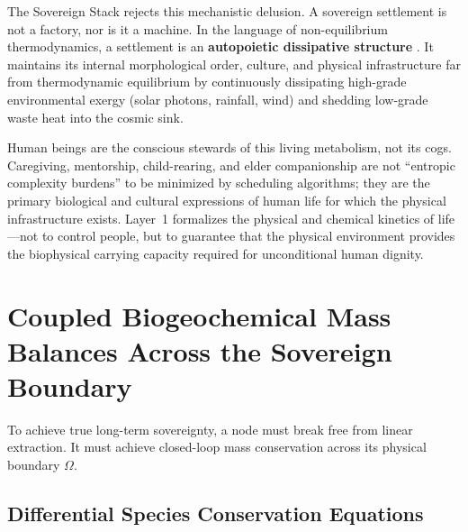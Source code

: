 The Sovereign Stack rejects this mechanistic delusion. A sovereign settlement is not a factory, nor is it a machine. In the language of non-equilibrium thermodynamics, a settlement is an \textbf{autopoietic dissipative structure} \cite{maturana1980autopoiesis, prigogine1977time}. It maintains its internal morphological order, culture, and physical infrastructure far from thermodynamic equilibrium by continuously dissipating high-grade environmental exergy (solar photons, rainfall, wind) and shedding low-grade waste heat into the cosmic sink.

Human beings are the conscious stewards of this living metabolism, not its cogs. Caregiving, mentorship, child-rearing, and elder companionship are not ``entropic complexity burdens'' to be minimized by scheduling algorithms; they are the primary biological and cultural expressions of human life for which the physical infrastructure exists. Layer~1 formalizes the physical and chemical kinetics of life---not to control people, but to guarantee that the physical environment provides the biophysical carrying capacity required for unconditional human dignity.

\section{Coupled Biogeochemical Mass Balances Across the Sovereign Boundary}

To achieve true long-term sovereignty, a node must break free from linear extraction. It must achieve closed-loop mass conservation across its physical boundary $\Omega$.

\subsection{Differential Species Conservation Equations}

